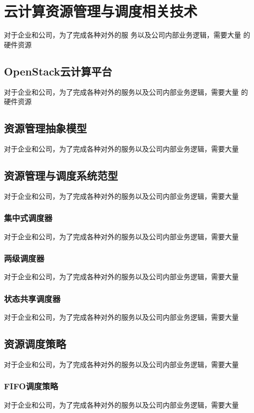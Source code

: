 
\chapter{云计算资源管理与调度相关技术}
\label{chap:outline}

对于企业和公司，为了完成各种对外的服
务以及公司内部业务逻辑，需要大量
的硬件资源

\section{OpenStack云计算平台}

对于企业和公司，为了完成各种对外的服务以及公司内部业务逻辑，需要大量
的硬件资源

\section{资源管理抽象模型}

对于企业和公司，为了完成各种对外的服务以及公司内部业务逻辑，需要大量

\section{资源管理与调度系统范型}
对于企业和公司，为了完成各种对外的服务以及公司内部业务逻辑，需要大量
\subsection{集中式调度器}
对于企业和公司，为了完成各种对外的服务以及公司内部业务逻辑，需要大量
\subsection{两级调度器}
对于企业和公司，为了完成各种对外的服务以及公司内部业务逻辑，需要大量
\subsection{状态共享调度器}
对于企业和公司，为了完成各种对外的服务以及公司内部业务逻辑，需要大量

\section{资源调度策略}

对于企业和公司，为了完成各种对外的服务以及公司内部业务逻辑，需要大量

\subsection{FIFO调度策略}
对于企业和公司，为了完成各种对外的服务以及公司内部业务逻辑，需要大量
